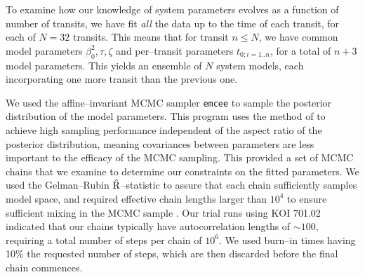 
To examine how our knowledge of system parameters evolves as a
function of number of transits, we have fit {\it all} the data up to
the time of each transit, for each of $N = 32$ transits.  This means
that for transit $n \leq N$, we have common model parameters
$\beta_{0}^2, \tau, \zeta$ and per--transit parameters $t_{0;i=1..n}$,
for a total of $n+3$ model parameters.  This yields an ensemble of $N$
system models, each incorporating one more transit than the previous
one.

We used the affine--invariant MCMC sampler {\tt emcee}
\citep{2013PASP..125..306F} to sample the posterior distribution of
the model parameters.  This program uses the method of
\cite{Goodman-Weare} to achieve high sampling performance independent
of the aspect ratio of the posterior distribution, meaning covariances
between parameters are less important to the efficacy of the MCMC
sampling.  This provided a set of MCMC chains that we examine to
determine our constraints on the fitted parameters.  We used the
Gelman--Rubin $\hat{\rm R}$--statistic \citep{Gelman92} to assure that
each chain sufficiently samples model space, and required effective
chain lengths larger than $10^4$ to ensure sufficient mixing in the
MCMC sample \cite[e.g.][]{2004PhRvD..69j3501T}.  Our trial runs using
KOI 701.02 indicated that our chains typically have autocorrelation
lengths of $\sim 100$, requiring a total number of steps per chain of
$10^6$.  We used burn--in times having 10\% the requested number of
steps, which are then discarded before the final chain commences.

